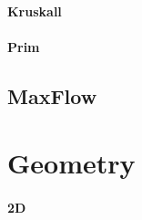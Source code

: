 \documentclass[a4paper]{article}
\begin{document}
\paragraph{Kruskall} \hfill

\paragraph{Prim} \hfill

\subsection{MaxFlow}

\section{Geometry}
\paragraph{2D} \hfill

\end{document}
